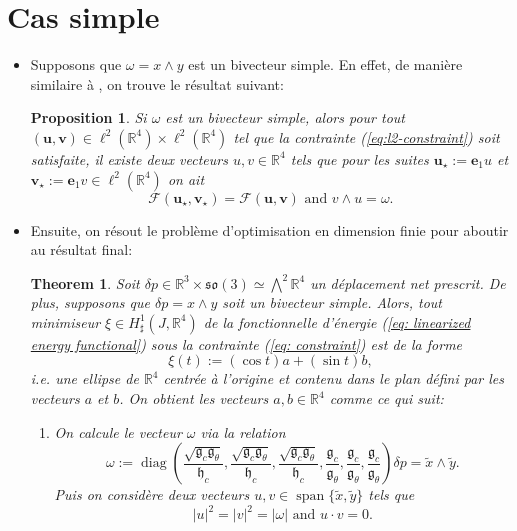 \documentclass[12pt,a4paper]{article}
\theoremstyle{plain}
\newtheorem{theorem}{Theorem}[section]
\theoremstyle{plain}
\theoremstyle{plain}
\theoremstyle{definition}
\theoremstyle{definition}
\theoremstyle{definition}
\theoremstyle{plain}
\newtheorem{proposition}{Proposition}[section]
\newcommand{\R}{\mathbb{R}}
\newcommand{\so}{\mathfrak{so}}
\DeclareMathOperator{\diag}{diag}
\DeclareMathOperator{\Span}{span}
\begin{document}
\section{Cas simple}
\begin{itemize}
\item Supposons que $\omega = x\wedge y$ est un bivecteur simple. En effet, de manière similaire à \cite{Alouges2017}, on trouve le résultat suivant:

\begin{proposition}
\label{prop:simple reduction}
Si $\omega$ est un bivecteur simple, alors pour tout$(\mathbf{u}, \mathbf{v}) \in \ell^2(\R^4) \times \ell^2(\R^4)$ tel que la contrainte (\ref{eq:l2-constraint}) soit satisfaite, il existe deux vecteurs $u,v \in \R^4$ tels que pour les suites $\mathbf{u}_{\star} := \mathbf{e}_1 u$ et $\mathbf{v}_\star := \mathbf{e}_1 v \in \ell^2(\R^4)$ on ait 
\begin{equation}
\mathcal{F}(\mathbf{u_{\star}}, \mathbf{v_{\star}}) = \mathcal{F}(\mathbf{u}, \mathbf{v}) \text{ and } v \wedge u = \omega.
\end{equation}
\end{proposition}

\item Ensuite, on résout le problème d'optimisation en dimension finie pour aboutir au résultat final:


\begin{theorem}
\label{thm:optimal control curves in the simple case}
Soit $\delta p \in \R^3 \times \so(3) \simeq \bigwedge^2 \R^4$ un déplacement net prescrit. De plus, supposons que $\delta p = x \wedge y$ soit un bivecteur simple. Alors, tout minimiseur $\xi \in H_{\sharp}^1(J, \R^4)$ de la fonctionnelle d'énergie (\ref{eq: linearized energy functional}) sous la contrainte (\ref{eq: constraint}) est de la forme
\begin{equation}
\xi(t) := (\cos t) a + (\sin t) b,
\end{equation}
i.e. une ellipse de $\R^4$ centrée à l'origine et contenu dans le plan défini par les vecteurs $a$ et $b$. On obtient les vecteurs $a,b \in \R^4$ comme ce qui suit:
\begin{enumerate}
\item On calcule le vecteur $\omega$ via la relation
\begin{equation}
\omega := \diag \left (\frac{\sqrt{\mathfrak{g}_c \mathfrak{g}_{\theta}}}{\mathfrak{h}_c}, \frac{\sqrt{\mathfrak{g}_c \mathfrak{g}_{\theta}}}{\mathfrak{h}_c}, \frac{\sqrt{\mathfrak{g}_c \mathfrak{g}_{\theta}}}{\mathfrak{h}_c}, \frac{\mathfrak{g}_c}{\mathfrak{g}_\theta}, \frac{\mathfrak{g}_c}{\mathfrak{g}_\theta}, \frac{\mathfrak{g}_c}{\mathfrak{g}_\theta} \right ) \delta p = \tilde{x} \wedge \tilde{y}.
\end{equation}
Puis on considère deux vecteurs $u,v \in \Span\{\tilde{x}, \tilde{y}\}$ tels que
\begin{equation}
\label{eq:global minimizer condition}
|u|^2 = |v|^2 = |\omega| \text{ and } u \cdot v = 0.
\end{equation}


\end{enumerate}
\end{theorem}
\end{itemize}
\end{document}
